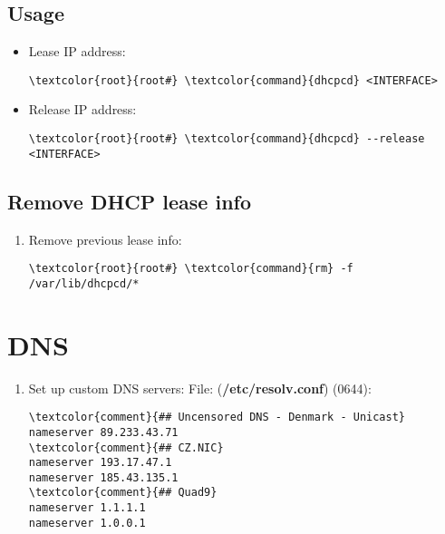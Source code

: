 \documentclass[10pt, a4paper, onecolumn, openany]{book} %
\begin{document}
\subsection{Usage}
\begin{itemize}
    \item Lease IP address:
\begin{Verbatim}[commandchars=\\\{\}]
\textcolor{root}{root#} \textcolor{command}{dhcpcd} <INTERFACE>
\end{Verbatim}
    \item Release IP address:
\begin{Verbatim}[commandchars=\\\{\}]
\textcolor{root}{root#} \textcolor{command}{dhcpcd} --release <INTERFACE>
\end{Verbatim}
\end{itemize}
\subsection{Remove DHCP lease info}
\begin{enumerate}
    \item Remove previous lease info:
\begin{Verbatim}[commandchars=\\\{\}]
\textcolor{root}{root#} \textcolor{command}{rm} -f /var/lib/dhcpcd/*
\end{Verbatim}
\end{enumerate}
\section{DNS}
\begin{enumerate}
    \item Set up custom DNS servers:
\newline File: (\textbf{\textcolor{file}{/etc/resolv.conf}}) (0644):
\begin{Verbatim}[commandchars=\\\{\}]
\textcolor{comment}{## Uncensored DNS - Denmark - Unicast}
nameserver 89.233.43.71
\textcolor{comment}{## CZ.NIC}
nameserver 193.17.47.1
nameserver 185.43.135.1
\textcolor{comment}{## Quad9}
nameserver 1.1.1.1
nameserver 1.0.0.1
\end{Verbatim}
\end{enumerate}
\end{document}
